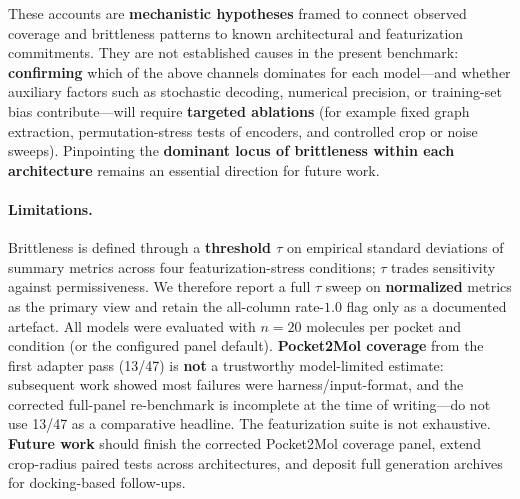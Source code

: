\documentclass[11pt]{article}
\begin{document}
These accounts are \textbf{mechanistic hypotheses} framed to connect observed coverage and brittleness patterns to known architectural and featurization commitments. They are not established causes in the present benchmark: \textbf{confirming} which of the above channels dominates for each model---and whether auxiliary factors such as stochastic decoding, numerical precision, or training-set bias contribute---will require \textbf{targeted ablations} (for example fixed graph extraction, permutation-stress tests of encoders, and controlled crop or noise sweeps). Pinpointing the \textbf{dominant locus of brittleness within each architecture} remains an essential direction for future work.

\paragraph{Limitations.}
Brittleness is defined through a \textbf{threshold $\tau$} on empirical standard deviations of summary metrics across four featurization-stress conditions; $\tau$ trades sensitivity against permissiveness. We therefore report a full $\tau$ sweep on \textbf{normalized} metrics as the primary view and retain the all-column rate-$1.0$ flag only as a documented artefact. All models were evaluated with \textbf{$n = 20$} molecules per pocket and condition (or the configured panel default). \textbf{Pocket2Mol coverage} from the first adapter pass (13/47) is \textbf{not} a trustworthy model-limited estimate: subsequent work showed most failures were harness/input-format, and the corrected full-panel re-benchmark is incomplete at the time of writing---do not use 13/47 as a comparative headline. The featurization suite is not exhaustive. \textbf{Future work} should finish the corrected Pocket2Mol coverage panel, extend crop-radius paired tests across architectures, and deposit full generation archives for docking-based follow-ups.



\end{document}
